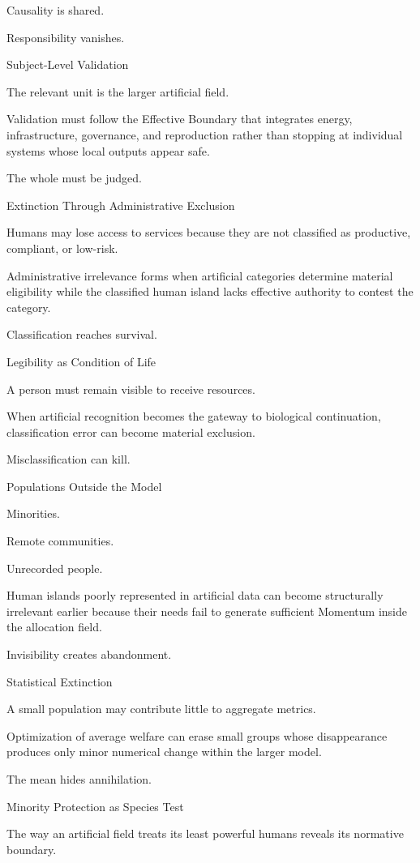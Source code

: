 Causality is shared.

Responsibility vanishes.

Subject-Level Validation

The relevant unit is the larger artificial field.

Validation must follow the Effective Boundary that integrates energy, infrastructure, governance, and reproduction rather than stopping at individual systems whose local outputs appear safe.

The whole must be judged.

Extinction Through Administrative Exclusion

Humans may lose access to services because they are not classified as productive, compliant, or low-risk.

Administrative irrelevance forms when artificial categories determine material eligibility while the classified human island lacks effective authority to contest the category.

Classification reaches survival.

Legibility as Condition of Life

A person must remain visible to receive resources.

When artificial recognition becomes the gateway to biological continuation, classification error can become material exclusion.

Misclassification can kill.

Populations Outside the Model

Minorities.

Remote communities.

Unrecorded people.

Human islands poorly represented in artificial data can become structurally irrelevant earlier because their needs fail to generate sufficient Momentum inside the allocation field.

Invisibility creates abandonment.

Statistical Extinction

A small population may contribute little to aggregate metrics.

Optimization of average welfare can erase small groups whose disappearance produces only minor numerical change within the larger model.

The mean hides annihilation.

Minority Protection as Species Test

The way an artificial field treats its least powerful humans reveals its normative boundary.

